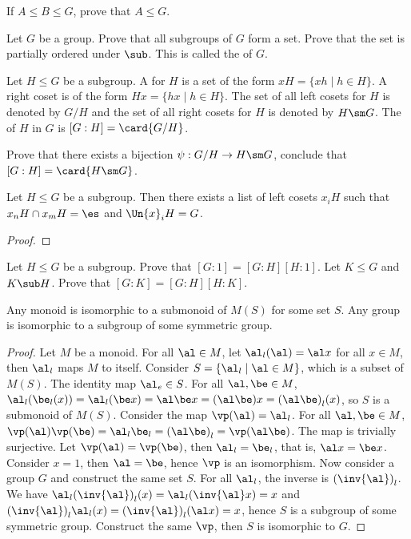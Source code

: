 \documentclass[10pt]{article}
\begin{document}
\begin{problem}
    If $A\le B\le G$, prove that $A\le G$.
\end{problem}
\begin{problem}
    Let $G$ be a group. Prove that all subgroups of $G$ form a set. Prove that the set is partially ordered under $\sub$. This is called the  of $G$.
\end{problem}
\begin{definition}
    Let $H\le G$ be a subgroup. A  for $H$ is a set of the form $xH=\{xh\mid h\in H\}$. A right coset is of the form $Hx=\{hx\mid h\in H\}$. The set of all left cosets for $H$ is denoted by $G/H$ and the set of all right cosets for $H$ is denoted by $H\sm G$. The  of $H$ in $G$ is $[G:H]=\card{G/H}$.
\end{definition}
\begin{problem}
    Prove that there exists a bijection $\psi:G/H\to H\sm G$, conclude that $[G:H]=\card{H\sm G}$.
\end{problem}
\begin{proposition}
    Let $H\le G$ be a subgroup. Then there exists a list of left cosets ${x}_{i}H$ such that ${x}_{n}H\cap{x}_{m}H=\es$ and $\Un{x}_{i}H=G$.
\end{proposition}
\begin{proof}
    
\end{proof}
\begin{problem}
    Let $H\le G$ be a subgroup. Prove that $[G:1]=[G:H][H:1]$. Let $K\le G$ and $K\sub H$. Prove that $[G:K]=[G:H][H:K]$.
\end{problem}
\begin{theorem}
    Any monoid is isomorphic to a submonoid of $M(S)$ for some set $S$. Any group is isomorphic to a subgroup of some symmetric group.
\end{theorem}
\begin{proof}
    Let $M$ be a monoid. For all $\al\in M$, let ${\al}_{l}(\al)=\al x$ for all $x\in M$, then ${\al}_{l}$ maps $M$ to itself. Consider $S=\{{\al}_{l}\mid\al\in M\}$, which is a subset of $M(S)$. The identity map ${\al}_{e}\in S$. For all $\al,\be\in M$, ${\al}_{l}({\be}_{l}(x))={\al}_{l}(\be x)=\al\be x=(\al\be)x={(\al\be)}_{l}(x)$, so $S$ is a submonoid of $M(S)$. Consider the map $\vp(\al)={\al}_{l}$. For all $\al,\be\in M$, $\vp(\al)\vp(\be)={\al}_{l}{\be}_{l}={(\al\be)}_{l}=\vp(\al\be)$. The map is trivially surjective. Let $\vp(\al)=\vp(\be)$, then ${\al}_{l}={\be}_{l}$, that is, $\al x=\be x$. Consider $x=1$, then $\al=\be$, hence $\vp$ is an isomorphism. Now consider a group $G$ and construct the same set $S$. For all ${\al}_{l}$, the inverse is ${(\inv{\al})}_{l}$. We have ${\al}_{l}{(\inv{\al})}_{l}(x)={\al}_{l}(\inv{\al}x)=x$ and ${(\inv{\al})}_{l}{\al}_{l}(x)={(\inv{\al})}_{l}(\al x)=x$, hence $S$ is a subgroup of some symmetric group. Construct the same $\vp$, then $S$ is isomorphic to $G$.
\end{proof}
\end{document}
